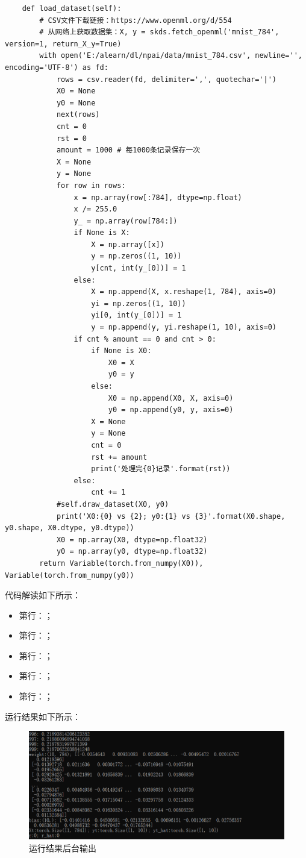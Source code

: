 \documentclass[UTF8]{article}
\begin{document}
\begin{lstlisting}
    def load_dataset(self):
        # CSV文件下载链接：https://www.openml.org/d/554
        # 从网络上获取数据集：X, y = skds.fetch_openml('mnist_784', version=1, return_X_y=True)
        with open('E:/alearn/dl/npai/data/mnist_784.csv', newline='', encoding='UTF-8') as fd:
            rows = csv.reader(fd, delimiter=',', quotechar='|')
            X0 = None
            y0 = None
            next(rows)
            cnt = 0
            rst = 0
            amount = 1000 # 每1000条记录保存一次
            X = None
            y = None
            for row in rows:
                x = np.array(row[:784], dtype=np.float)
                x /= 255.0
                y_ = np.array(row[784:])
                if None is X:
                    X = np.array([x])
                    y = np.zeros((1, 10))
                    y[cnt, int(y_[0])] = 1
                else:
                    X = np.append(X, x.reshape(1, 784), axis=0)
                    yi = np.zeros((1, 10))
                    yi[0, int(y_[0])] = 1
                    y = np.append(y, yi.reshape(1, 10), axis=0)
                if cnt % amount == 0 and cnt > 0:
                    if None is X0:
                        X0 = X
                        y0 = y
                    else:
                        X0 = np.append(X0, X, axis=0)
                        y0 = np.append(y0, y, axis=0)
                    X = None
                    y = None
                    cnt = 0
                    rst += amount
                    print('处理完{0}记录'.format(rst))
                else:
                    cnt += 1
            #self.draw_dataset(X0, y0)
            print('X0:{0} vs {2}; y0:{1} vs {3}'.format(X0.shape, y0.shape, X0.dtype, y0.dtype))
            X0 = np.array(X0, dtype=np.float32)
            y0 = np.array(y0, dtype=np.float32)
        return Variable(torch.from_numpy(X0)), Variable(torch.from_numpy(y0))
\end{lstlisting}
代码解读如下所示：
\begin{itemize}
\item 第行：；
\item 第行：；
\item 第行：；
\item 第行：；
\item 第行：；
\end{itemize}
运行结果如下所示：
\begin{figure}[H]
	\caption{运行结果后台输出}
	\label{f000033}
	\centering
	\includegraphics[width=15cm]{images/f000033}
\end{figure}
\end{document}
